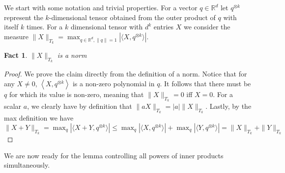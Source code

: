 \documentclass[12pt]{colt2019} %
\newtheorem{fact}[theorem]{Fact}
\newcommand{\ip}[1]{\left \langle #1 \right \rangle}
\newcommand{\R}{\mathbb{R}}
\begin{document}
We start with some notation and trivial properties. 
For a vector $q \in \R^d$ let $q^{\otimes k}$ represent the $k$-dimensional tensor obtained from the outer product of $q$ with itself $k$ times. For a $k$ dimensional tensor with $d^k$ entries $X$ we consider the measure
$\|X\|_{T_k} = \max_{q \in \R^d, \|q\|=1} \left| \langle X, q^{\otimes k}\rangle \right|$.
\begin{fact}
$\|X\|_{T_k}$ is a norm
\end{fact}
\begin{proof}
We prove the claim directly from the definition of a norm.
Notice that for any $X \neq 0$, $\ip{X, q^{\otimes k}}$ is a non-zero polynomial in $q$. It follows that there must be $q$ for which its value is non-zero, meaning that $\|X\|_{T_k}=0$ iff $X=0$. For a scalar $a$, we clearly have by definition that
$\|aX\|_{T_k} = |a|\|X\|_{T_k}$.  Lastly, by the max definition we  have
$ \|X+Y\|_{T_k} =  \max_q \left| \langle X+Y, q^{\otimes k}\rangle \right| \leq 
\max_q \left| \langle X, q^{\otimes k}\rangle \right| + \max_q\left| \langle Y, q^{\otimes k}\rangle \right| = \|X\|_{T_k} + \|Y\|_{T_k}$
\end{proof}

We are now ready for the lemma controlling all powers of inner products simultaneously. 
\end{document}
